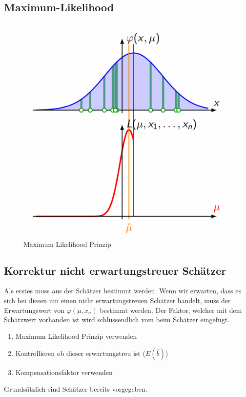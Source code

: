 \documentclass[../Main.tex]{subfiles}
\begin{document}
\subsection{Maximum-Likelihood}
\begin{figure}[H]
    \centering
    \includegraphics[width=0.5\linewidth]{Images/maximum-likelihood.png}
    \caption{Maximum Likelihood Prinzip}
\end{figure}


\subsection{Korrektur nicht erwartungstreuer Schätzer}
Als erstes muss aus der Schätzer bestimmt werden. Wenn wir erwarten, dass
es sich bei diesen um einen nicht erwartungstreuen Schätzer handelt, muss
der Erwartungswert von \(\varphi(\mu,x_n)\) bestimmt werden. Der Faktor,
welcher mit dem Schätzwert vorhanden ist wird schlussendlich vom beim 
Schätzer eingefügt.
\begin{enumerate}
    \item Maximum Likelihood Prinzip verwenden
    \item Kontrollieren ob dieser erwartungstreu ist (\(E(\hat{b})\))
    \item Kompensationsfaktor verwenden
\end{enumerate}
Grundsätzlich sind Schätzer bereits vorgegeben.
\end{document}
